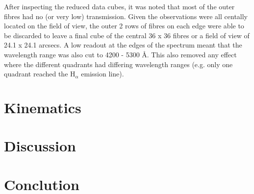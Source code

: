 \documentclass[a4paper,11pt]{article}
\begin{document}
		After inspecting the reduced data cubes, it was noted that most of the outer fibres had no (or very low) transmission. Given the observations were all centally located on the field of view, the outer 2 rows of fibres on each edge were able to be discarded to leave a final cube of the central 36 x 36 fibres or a field of view of 24.1 x 24.1 arcsecs. A low readout at the edges of the spectrum meant that the wavelength range was also cut to 4200 - 5300 \AA. This also removed any effect where the different quadrants had differing wavelength ranges (e.g. only one quadrant reached the H$_\alpha$ emission line). 

\section{Kinematics}
	\label{sec:kine}

\section{Discussion}
	\label{sec:discuss}

\section{Conclution}
	\label{sec:conc}





{}
\end{document}
